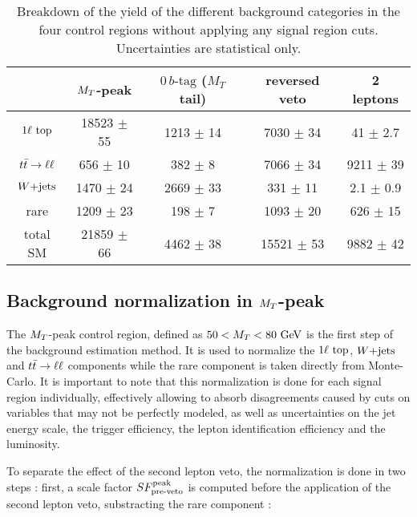 \begin{table}[h!]
    \centering
\begin{tabular}{|c|cccc|}
    \hline
                     & $M_T$-peak       & $0\, b\text{-tag}$ ($M_T$ tail) & reversed veto    & 2 leptons             \\
    \hline
     $1\ell~\text{top}$ & 18523 $\pm$ 55   &  1213 $\pm$ 14        &  7030 $\pm$ 34   &   41 $\pm$ 2.7  \\
     $t\bar{t} \rightarrow \ell \ell$  &   656 $\pm$ 10   &   382 $\pm$ 8         &  7066 $\pm$ 34   & 9211 $\pm$ 39   \\
     $\text{$W$+jets}$        &  1470 $\pm$ 24   &  2669 $\pm$ 33        &   331 $\pm$ 11   &  2.1 $\pm$ 0.9  \\
     rare            &  1209 $\pm$ 23   &   198 $\pm$ 7         &  1093 $\pm$ 20   &  626 $\pm$ 15   \\
    \hline
     total SM        & 21859 $\pm$ 66   &  4462 $\pm$ 38        & 15521 $\pm$ 53   & 9882 $\pm$ 42   \\
    \hline
\end{tabular}
    \caption{Breakdown of the yield of the different background categories in the four
    control regions without applying any signal region cuts. Uncertainties are statistical only.}
    \label{tab:cutflowControlRegions}
\end{table}

        \subsection{Background normalization in $M_T$-peak \label{sec:MTpeakNormalization}}

    The $M_T$-peak control region, defined as $50 < M_T < 80 ~\text{GeV}$ is the first step of the
    background estimation method. It is used to normalize the $1\ell~\text{top}$, $\text{$W$+jets}$ and
    $t\bar{t} \rightarrow \ell \ell$ components while the rare component is taken directly from Monte-Carlo.
    It is important to note that this normalization is done for each signal region individually,
    effectively allowing to absorb disagreements caused by cuts on variables that may not
    be perfectly modeled, as well as uncertainties on the jet energy scale, the trigger efficiency,
    the lepton identification efficiency and the luminosity.

    To separate the effect of the second lepton veto, the  normalization is done in two
    steps : first, a scale factor $SF_{\text{pre-veto}}^{\text{peak}}$ is computed before the application of the
    second lepton veto, substracting the rare component :

